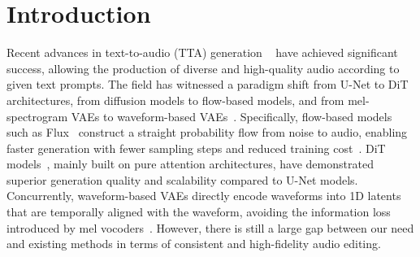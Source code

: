 \maketitle

\begin{abstract}
Text-to-audio (TTA) generation has made significant strides, yet achieving precise and consistent audio editing remains a major challenge. However, existing methods struggle to balance temporal consistency with background preservation. In this paper, we propose FreeSonic, a training-free framework leveraging the state-of-the-art Rectified Flow-based TangoFlux model. FreeSonic utilizes an optimized inversion-reverse process and joint text-audio attention maps for precise target segment extraction. For content editing, a novel scheduled attention decoupling confines modifications to target regions while preserving original acoustic context. Furthermore, task-oriented noise injection enhances versatility for tasks such as audio removal and non-rigid replacement. Extensive experimental results demonstrate that FreeSonic achieves a superior balance by providing a high-fidelity and efficient solution for precise and consistent audio editing.
Project and demos: \href{https://free-sonic.github.io/}{https://free-sonic.github.io/}.
\end{abstract}

\section{Introduction}

Recent advances in text-to-audio (TTA) generation ~\cite{liu2023audioldm,ghosal2023text,huang2023make,evans2024fast} have achieved significant success, allowing the production of diverse and high-quality audio according to given text prompts. The field has witnessed a paradigm shift from U-Net to DiT architectures, from diffusion models to flow-based models, and from mel-spectrogram VAEs to waveform-based VAEs~\cite{hung2024tangoflux,li2025meanaudio,evans2024long,lee2024etta}. Specifically, flow-based models such as Flux~\cite{flux2024} construct a straight probability flow from noise to audio, enabling faster generation with fewer sampling steps and reduced training cost~\cite{lipman2022flow}. DiT models~\cite{peebles2023scalable}, mainly built on pure attention architectures, have demonstrated superior generation quality and scalability compared to U-Net models. Concurrently, waveform-based VAEs directly encode waveforms into 1D latents that are temporally aligned with the waveform, avoiding the information loss introduced by mel vocoders~\cite{li2025bridge,li2026audio}. However, there is still a large gap between our need and existing methods in terms of consistent and high-fidelity audio editing.

